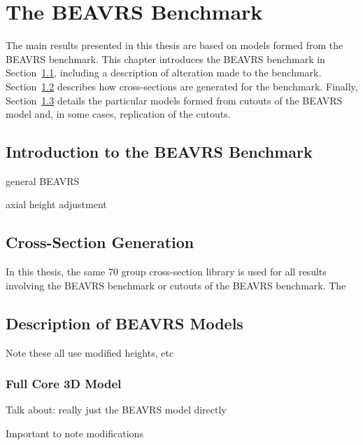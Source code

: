 \chapter{The BEAVRS Benchmark}
\label{chap:beavrs}

The main results presented in this thesis are based on models formed from the BEAVRS benchmark. This chapter introduces the BEAVRS benchmark in Section~\ref{sec:beavrs-intro}, including a description of alteration made to the benchmark. Section~\ref{sec:beavrs-xs-gen} describes how cross-sections are generated for the benchmark. Finally, Section~\ref{sec:beavrs-models} details the particular models formed from cutouts of the BEAVRS model and, in some cases, replication of the cutouts.

\section{Introduction to the BEAVRS Benchmark}
\label{sec:beavrs-intro}

general BEAVRS

axial height adjustment


\section{Cross-Section Generation}
\label{sec:beavrs-xs-gen}

In this thesis, the same 70 group cross-section library is used for all results involving the BEAVRS benchmark or cutouts of the BEAVRS benchmark. The

\section{Description of BEAVRS Models}
\label{sec:beavrs-models}

Note these all use modified heights, etc

\subsection{Full Core 3D Model}
\label{sec:beavrs-3D}

Talk about: really just the BEAVRS model directly

Important to note modifications

